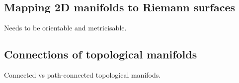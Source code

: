 
\subsection{Mapping 2D manifolds to Riemann surfaces}


Needs to be orientable and metricisable.


\subsection{Connections of topological manifolds}

Connected vs path-connected topological manifods.

